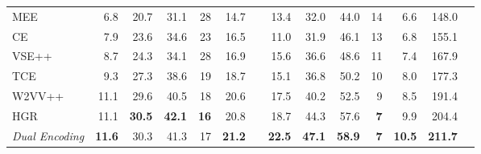 \begin{table*} [tb!]
{\begin{tabular}{@{}l*{12}{r}c @{}}
MEE \cite{miech2018learning}      & 6.8 & 20.7 & 31.1 & 28 & 14.7  &&   13.4 & 32.0 & 44.0 & 14 & 6.6  & 148.0 \\
CE \cite{liu2019use}              & 7.9 & 23.6 & 34.6 & 23 & 16.5 &&       11.0 & 31.9 & 46.1 & 13  & 6.8 & 155.1 \\
VSE++ \cite{faghri2017vse}        & 8.7  & 24.3 & 34.1 & 28 & 16.9 &&      15.6 & 36.6 & 48.6 & 11 & 7.4 & 167.9 \\
TCE \cite{sigir2020tree}          & 9.3 & 27.3 & 38.6 & 19 & 18.7 &&       15.1 & 36.8 & 50.2 & 10 & 8.0 & 177.3 \\
W2VV++ \cite{li2019w2vv++}        & 11.1 & 29.6 & 40.5 & 18 & 20.6 &&      17.5 & 40.2 & 52.5 & 9 & 8.5 & 191.4 \\
HGR \cite{chen2020fine}           & 11.1 &	\textbf{30.5} &	\textbf{42.1} & \textbf{16} & 20.8 &&    18.7 & 44.3 & 57.6 & \textbf{7} & 9.9 & 204.4 \\
\textit{Dual Encoding}         & \textbf{11.6} & 30.3 & 41.3 & 17 & \textbf{21.2} && \textbf{22.5} & \textbf{47.1} & \textbf{58.9} & \textbf{7} & \textbf{10.5} & \textbf{211.7} \\  [3pt]



\end{tabular}}
\end{table*}
